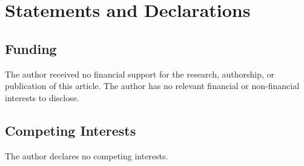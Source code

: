 \documentclass[preprints,article,submit,pdftex,moreauthors]{Definitions/mdpi}
\begin{document}



\section*{Statements and Declarations}
\subsection*{Funding}  
The author received no financial support for the research, authorship, or publication of this article.
The author has no relevant financial or non-financial interests to disclose.

\subsection*{Competing Interests}  
The author declares no competing interests.
\end{document}

